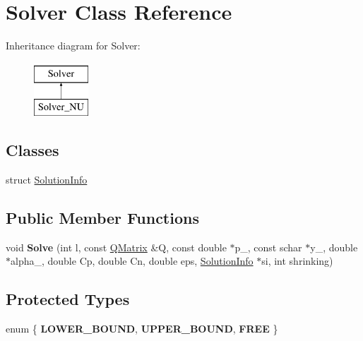 \hypertarget{class_solver}{
\section{Solver Class Reference}
\label{class_solver}
}
Inheritance diagram for Solver:\begin{figure}[H]
\begin{center}
\leavevmode
\includegraphics[height=2cm]{class_solver}
\end{center}
\end{figure}
\subsection*{Classes}
\begin{DoxyCompactItemize}
\item 
struct \hyperlink{struct_solver_1_1_solution_info}{SolutionInfo}
\end{DoxyCompactItemize}
\subsection*{Public Member Functions}
\begin{DoxyCompactItemize}
\item 
\hypertarget{class_solver_aa3ab5672a26826f9dc1ac9145620a823}{
void {\bfseries Solve} (int l, const \hyperlink{class_q_matrix}{QMatrix} \&Q, const double $\ast$p\_\-, const schar $\ast$y\_\-, double $\ast$alpha\_\-, double Cp, double Cn, double eps, \hyperlink{struct_solver_1_1_solution_info}{SolutionInfo} $\ast$si, int shrinking)}
\label{class_solver_aa3ab5672a26826f9dc1ac9145620a823}

\end{DoxyCompactItemize}
\subsection*{Protected Types}
\begin{DoxyCompactItemize}
\item 
enum \{ {\bfseries LOWER\_\-BOUND}, 
{\bfseries UPPER\_\-BOUND}, 
{\bfseries FREE}
 \}
\end{DoxyCompactItemize}
